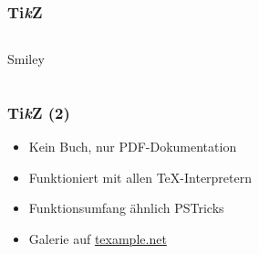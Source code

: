 \begin{frame}
  \frametitle{Ti\emph{k}Z}
  \begin{columns}[T]
    \begin{column}{.25\textwidth}
      Smiley
    \end{column}
    \begin{column}{.75\textwidth}
    \end{column}
  \end{columns}
\end{frame}

\begin{frame}
  \frametitle{Ti\emph{k}Z (2)}
  \begin{itemize}
  \item Kein Buch, nur PDF-Dokumentation
  \item Funktioniert mit allen \TeX-Interpretern
  \item Funktionsumfang ähnlich PSTricks
  \item Galerie auf \href{http://www.texample.net}{texample.net}
  \end{itemize}
\end{frame}

